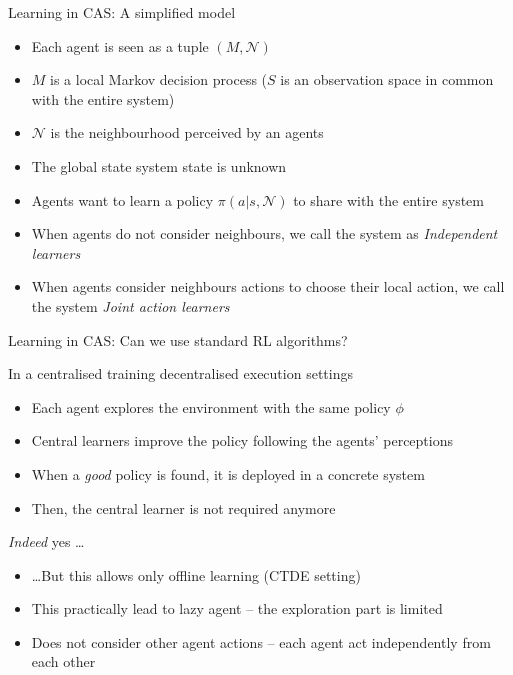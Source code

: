 \documentclass[presentation]{beamer}\mode<presentation>{\usetheme{AMSBolognaFC}}
\begin{document}
\begin{frame}{Learning in CAS: A simplified model}
	\begin{exampleblock}{}		
		\begin{itemize}
			\item Each agent is seen as a tuple $(M, \mathcal{N})$
			\item $M$ is a local Markov decision process ($S$ is an observation space in common with the entire system)
			\item $\mathcal{N}$ is the neighbourhood perceived by an agents
			\item The global state system state is unknown
			\item Agents want to learn a policy $\pi(a | s, \mathcal{N})$ to share with the entire system
			\item When agents do not consider neighbours, we call the system as \emph{Independent learners}
			\item When agents consider neighbours actions to choose their local action, we call the system \emph{Joint action learners} 
		
		\end{itemize}
	\end{exampleblock}
\end{frame}

\begin{frame}{Learning in CAS: Can we use standard RL algorithms?}
	\begin{exampleblock}{In a centralised training decentralised execution settings}
		\begin{itemize}
			\item Each agent explores the environment with the same policy $\phi$
			\item Central learners improve the policy following the agents' perceptions
			\item When a \emph{good} policy is found, it is deployed in a concrete system
			\item Then, the central learner is not required anymore
		\end{itemize}
	\end{exampleblock}
	\begin{exampleblock}{\emph{Indeed} yes \dots}
		\begin{itemize}
			\item \dots But this allows only offline learning (CTDE setting)
			\item This practically lead to lazy agent -- the exploration part is limited 
			\item Does not consider other agent actions -- each agent act independently from each other
		\end{itemize}
	\end{exampleblock}
\end{frame}
\end{document}
